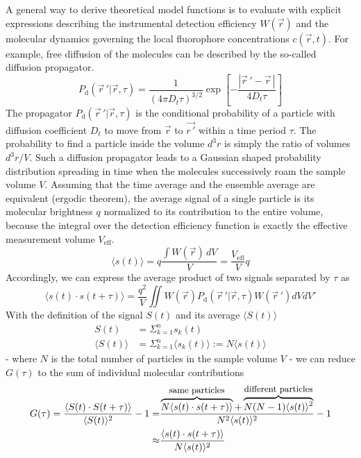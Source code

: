 A general way to derive theoretical model functions is to evaluate  with explicit expressions describing the instrumental detection efficiency $W(\vec{r})$ and the molecular dynamics governing the local fluorophore concentrations $c(\vec{r},t)$. For example, free diffusion of the molecules can be described by the so-called diffusion propagator.
	\begin{equation}
	\label{eq4}
	P_\mathrm{d} \left( \vec{r} \,' | \vec{r},\tau \right) = \frac{1}{\left( 4 \pi D_t \tau \right) ^{3/2}} \exp \left[ - \frac{\left| \vec{r} \,' -\vec{r} \, \right|} {4D_t \tau} \right]
	\end{equation}
The propagator $P_\mathrm{d} \left( \vec{r} \,' | \vec{r},\tau \right)$ is the conditional probability of a particle with diffusion coefficient $D_t$ to move from $\vec{r}$ to $\vec{r \,'}$ within a time period $\tau$. 
The probability to find a particle inside the volume $d^3r$ is simply the ratio of  volumes $d^3r/V$.
 Such a diffusion propagator leads to a Gaussian shaped probability distribution spreading in time when the molecules successively roam the sample volume $V$.
Assuming that the time average and the ensemble average are equivalent (ergodic theorem), the average signal of a single particle is its molecular brightness $q$ normalized to its contribution to the entire volume, because the integral over the detection efficiency function is exactly the effective measurement volume $V_\mathrm{eff}$.
	\begin{equation}
	\label{eq5}
	\langle s(t) \rangle = q \frac{\int W(\vec{r}) \,dV}{V} = \frac{V_\mathrm{eff}}{V} q
	\end{equation}
Accordingly, we can express the average product of two signals separated by $\tau$ as
	\begin{equation}
	\label{eq6}
	\langle s(t) \cdot s(t + \tau) \rangle = \frac{q^2}{V}\iint W(\vec{r}) P_\mathrm{d} \left( \vec{r} \,' | \vec{r},\tau \right) W(\vec{r} \,') dVdV'
	\end{equation}
With the definition of the signal $S(t)$ and its average $\langle S(t) \rangle$
\begin{align}
S(t) &= \Sigma_{k=1}^n s_k(t) \\
\langle S(t) \rangle &= \Sigma_{k=1}^n \langle s_k(t) \rangle := N \langle s(t) \rangle
\end{align}
- where $N$ is the total number of particles in the sample volume $V$ - we can reduce $G(\tau)$ to the sum of individual molecular contributions
	\begin{align}
	G(\tau) = \frac{\langle S(t) \cdot S(t+\tau)\rangle}{\langle S(t) \rangle^2}-1 
	 =& \frac{\overbrace{N \langle s(t) \cdot s(t+\tau)\rangle}^{\mbox{\small same particles}} +\overbrace{N(N-1) \langle s(t) \rangle^2}^{\mbox{\small different particles}}}{N^2 \langle s(t) \rangle^2}-1  \notag \\
	\approx & \frac{\langle s(t) \cdot s(t+\tau)\rangle}{N \langle s(t) \rangle^2} \label{eq7} 
	\end{align}
